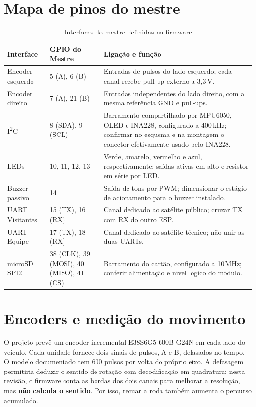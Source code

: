 \section{Mapa de pinos do mestre}
\begin{table}[htbp]\centering\small
\caption{Interfaces do mestre definidas no firmware}\label{tab:pinos-mestre}
\begin{tabularx}{\textwidth}{@{}p{3.0cm}p{2.4cm}X@{}}\toprule
Interface & GPIO do Mestre & Ligação e função\\\midrule
Encoder esquerdo & 5 (A), 6 (B) & Entradas de pulsos do lado esquerdo; cada canal recebe pull-up externo a 3,3\,V.\\
Encoder direito & 7 (A), 21 (B) & Entradas independentes do lado direito, com a mesma referência GND e pull-ups.\\
I\textsuperscript{2}C & 8 (SDA), 9 (SCL) & Barramento compartilhado por MPU6050, OLED e INA228, configurado a 400\,kHz; confirmar no esquema e na montagem o conector efetivamente usado pelo INA228.\\
LEDs & 10, 11, 12, 13 & Verde, amarelo, vermelho e azul, respectivamente; saídas ativas em alto e resistor em série por LED.\\
Buzzer passivo & 14 & Saída de tons por PWM; dimensionar o estágio de acionamento para o buzzer instalado.\\
UART Visitantes & 15 (TX), 16 (RX) & Canal dedicado ao satélite público; cruzar TX com RX do outro ESP.\\
UART Equipe & 17 (TX), 18 (RX) & Canal dedicado ao satélite técnico; não unir as duas UARTs.\\
microSD SPI2 & 38 (CLK), 39 (MOSI), 40 (MISO), 41 (CS) & Barramento do cartão, configurado a 10\,MHz; conferir alimentação e nível lógico do módulo.\\\bottomrule
\end{tabularx}\end{table}

\section{Encoders e medição do movimento}
O projeto prevê um encoder incremental E38S6G5-600B-G24N em cada lado do veículo. Cada unidade fornece dois sinais de pulsos, A e B, defasados no tempo. O modelo documentado tem 600 pulsos por volta do próprio eixo. A defasagem permitiria deduzir o sentido de rotação com decodificação em quadratura; nesta revisão, o firmware conta as bordas dos dois canais para melhorar a resolução, mas \textbf{não calcula o sentido}. Por isso, recuar a roda também aumenta o percurso acumulado.

